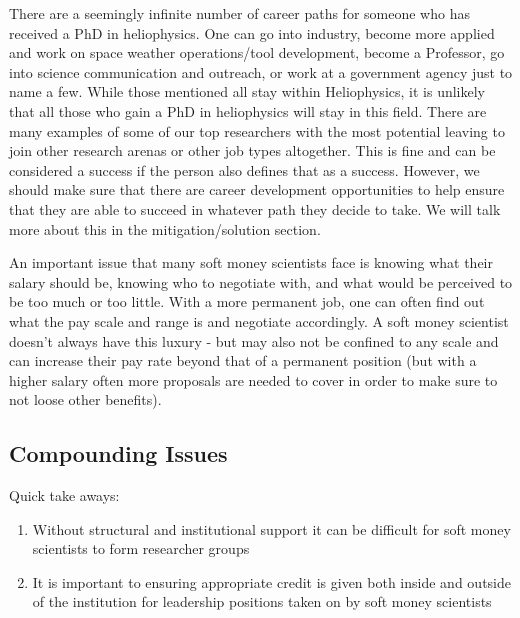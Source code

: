 \documentclass[letterpaper, 12pt]{article}
\begin{document}
       
There are a seemingly infinite number of career paths for someone who has received a PhD in heliophysics. One can go into industry, become more applied and work on space weather operations/tool development, become a Professor, go into science communication and outreach, or work at a government agency just to name a few. While those mentioned all stay within Heliophysics, it is unlikely that all those who gain a PhD in heliophysics will stay in this field. There are many examples of some of our top researchers with the most potential leaving to join other research arenas or other job types altogether. This is fine and can be considered a success if the person also defines that as a success. However, we should make sure that there are career development opportunities to help ensure that they are able to succeed in whatever path they decide to take. We will talk more about this in the mitigation/solution section. 

An important issue that many soft money scientists face is knowing what their salary should be, knowing who to negotiate with, and what would be perceived to be too much or too little. With a more permanent job, one can often find out what the pay scale and range is and negotiate accordingly. A soft money scientist doesn’t always have this luxury - but may also not be confined to any scale and can increase their pay rate beyond that of a permanent position (but with a higher salary often more proposals are needed to cover in order to make sure to not loose other benefits). 

\subsection{Compounding Issues}

\begin{tcolorbox}[enhanced,width=\textwidth,center upper,
    fontupper=\bfseries,sharp corners, colback=CASIIlightgrey, colframe=CASIIdarkgreen]
\textcolor{CASIIorange}{Quick take aways:}
\begin{enumerate}

    \item \textcolor{CASIIdarkindago}{Without structural and institutional support it can be difficult for soft money scientists to form researcher groups}
    \item \textcolor{CASIIdarkindago}{It is important to ensuring appropriate credit is given both inside and outside of the institution for leadership positions taken on by soft money scientists}

\end{enumerate}
\end{tcolorbox}
\end{document}
